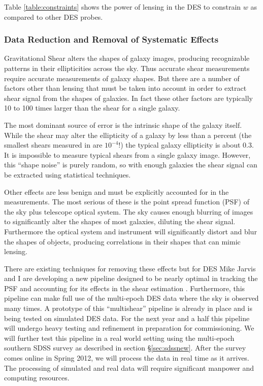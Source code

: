 \documentclass[12pt]{article}
\newcommand{\commissdate}{Spring 2012}
\begin{document}
Table \ref{table:constraints} shows the power of lensing in the DES to
constrain $w$ as compared to other DES probes.

\subsubsection{Data Reduction and Removal of Systematic Effects} 
\label{sec:des:process}

Gravitational Shear alters the shapes of galaxy images, producing recognizable
patterns in their ellipticities across the sky. Thus accurate shear
measurements require accurate measurements of galaxy shapes.  But there are a
number of factors other than lensing that must be taken into account in order
to extract shear signal from the shapes of galaxies. In fact these other
factors are typically 10 to 100 times larger than the shear for a single
galaxy.

The most dominant source of error is the intrinsic shape of the galaxy itself.
While the shear may alter the ellipticity of a galaxy by less than a percent
(the smallest shears measured in \cite{SheldonLensing07} are $10^{-4}$!) the
typical galaxy ellipticity is about 0.3.  It is impossible to measure typical
shears from a single galaxy image.  However, this ``shape noise'' is purely
random, so with enough galaxies the shear signal can be extracted using
statistical techniques.

Other effects are less benign and must be explicitly accounted for in the
measurements.  The most serious of these is the point spread function (PSF) of
the sky plus telescope optical system. The sky causes enough blurring of images
to significantly alter the shapes of most galaxies, diluting the shear signal.
Furthermore the optical system and instrument will significantly distort and
blur the shapes of objects, producing correlations in their shapes that can
mimic lensing.

There are existing techniques for removing these effects but for DES Mike
Jarvis and I are developing a new pipeline designed to be nearly optimal in
tracking the PSF and accounting for its effects in the shear estimation
\cite{Bern02,JarvisJain04}.  Furthermore, this pipeline can make full use of
the multi-epoch DES data where the sky is observed many times.  A prototype of
this ``multishear'' pipeline is already in place and is being tested on
simulated DES data.  For the next year and a half this pipeline will undergo
heavy testing and refinement in preparation for commissioning.  We will further
test this pipeline in a real world setting using the multi-epoch southern SDSS
survey as described in section \S \ref{sec:sdssnew}.  After the survey comes
online in \commissdate, we will process the data in real time as it arrives.  The
processing of simulated and real data will require significant manpower and
computing resources.
\end{document}
